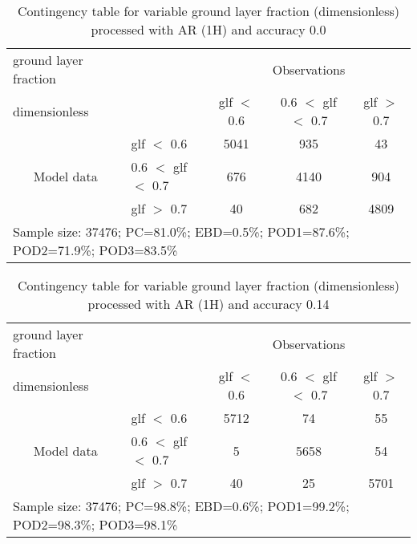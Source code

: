 \documentclass[11pt,english]{article}
\begin{document}
\begin{table}[]
\begin{center}
\begin{tabular}{llccc}
\hline
{ground layer fraction}                                       &                                                    & \multicolumn{3}{c}{Observations}                 \\
{dimensionless}                                       &                             & glf $<$ 0.6   & 0.6 $<$ glf $<$ 0.7 & glf $>$ 0.7 \\
\hline
\multicolumn{1}{c}{\multirow{3}{*}{Model data}}  & glf $<$ 0.6             & 5041                & 935                       & 43              \\
                                                 & 0.6  $<$ glf $<$ 0.7 & 676                & 4140                       & 904              \\
                                                 & glf $>$ 0.7             & 40                & 682                       & 4809              \\
\hline
\multicolumn{5}{l}{Sample size: 37476; PC=81.0\%; EBD=0.5\%; POD1=87.6\%; POD2=71.9\%; POD3=83.5\%}
\end{tabular}
\end{center}
\caption{Contingency table for variable ground layer fraction (dimensionless) processed with AR (1H) and accuracy 0.0}
\label{tab:contingencyglfAFT}
\end{table}
\begin{table}[]
\begin{center}
\begin{tabular}{llccc}
\hline
{ground layer fraction}                                       &                                                    & \multicolumn{3}{c}{Observations}                 \\
{dimensionless}                                       &                             & glf $<$ 0.6   & 0.6 $<$ glf $<$ 0.7 & glf $>$ 0.7 \\
\hline
\multicolumn{1}{c}{\multirow{3}{*}{Model data}}  & glf $<$ 0.6             & 5712                & 74                       & 55              \\
                                                 & 0.6  $<$ glf $<$ 0.7 & 5                & 5658                       & 54              \\
                                                 & glf $>$ 0.7             & 40                & 25                       & 5701              \\
\hline
\multicolumn{5}{l}{Sample size: 37476; PC=98.8\%; EBD=0.6\%; POD1=99.2\%; POD2=98.3\%; POD3=98.1\%}
\end{tabular}
\end{center}
\caption{Contingency table for variable ground layer fraction (dimensionless) processed with AR (1H) and accuracy 0.14}
\label{tab:contingencyglfAFT}
\end{table}
\end{document}
